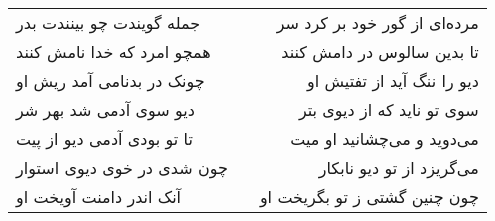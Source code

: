 \begin{center}
\begin{longtable}{l p{0.5cm} r}
جمله گویندت چو بینندت بدر
&&
مرده‌ای از گور خود بر کرد سر
\\
همچو امرد که خدا نامش کنند
&&
تا بدین سالوس در دامش کنند
\\
چونک در بدنامی آمد ریش او
&&
دیو را ننگ آید از تفتیش او
\\
دیو سوی آدمی شد بهر شر
&&
سوی تو ناید که از دیوی بتر
\\
تا تو بودی آدمی دیو از پیت
&&
می‌دوید و می‌چشانید او میت
\\
چون شدی در خوی دیوی استوار
&&
می‌گریزد از تو دیو نابکار
\\
آنک اندر دامنت آویخت او
&&
چون چنین گشتی ز تو بگریخت او
\\
\end{longtable}
\end{center}
